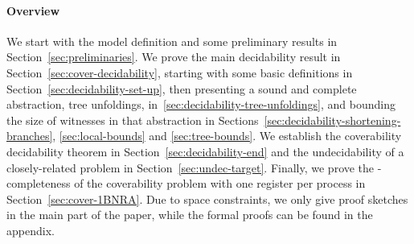 \paragraph*{Overview}


We start with the model definition and some preliminary results in Section~\ref{sec:preliminaries}. We prove the main decidability result in Section~\ref{sec:cover-decidability}, starting with some basic definitions in Section~\ref{sec:decidability-set-up}, then presenting a sound and complete abstraction, tree unfoldings, in~\ref{sec:decidability-tree-unfoldings}, and bounding the size of witnesses in that abstraction in Sections~\ref{sec:decidability-shortening-branches}, \ref{sec:local-bounds} and \ref{sec:tree-bounds}. We establish the coverability decidability theorem in Section~\ref{sec:decidability-end} and the undecidability of a closely-related problem in Section~\ref{sec:undec-target}. Finally, we prove the \NP-completeness of the coverability problem with one register per process in Section~\ref{sec:cover-1BNRA}.
Due to space constraints, we only give proof sketches in the main part of the paper, while the formal proofs can be found in the appendix.

%
%
%	
%
%
%
%	
%	
%	
%	
%	
%	
%	
%	
%	
%	
%	
%	
%	
%	
%	
%	
%	
%
	
